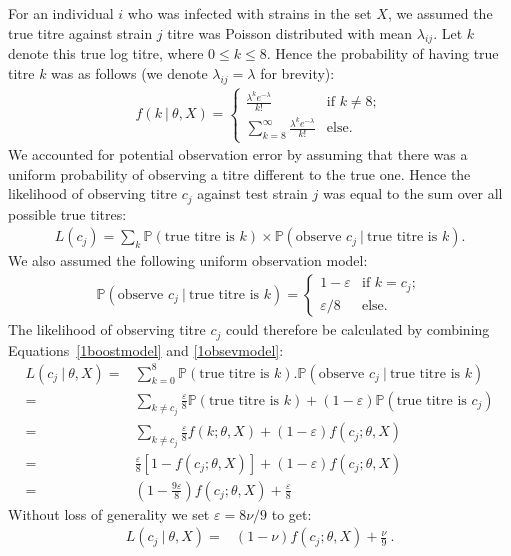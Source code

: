 \documentclass[12pt]{article}
\begin{document}
For an individual $i$ who was infected with strains in the set $X$, we assumed the true titre against strain $j$ titre was Poisson distributed with mean $\lambda_{ij}$. Let $k$ denote this true log titre, where $0 \leq k \leq 8$. Hence the probability of having true titre $k$ was as follows (we denote $\lambda_{ij}=\lambda$ for brevity):
\begin{align} 
f({k}~|~\theta,X)=  \left\{
\begin{array}{ll}
\frac{\lambda^{k} e^{-\lambda}}{{k}!} & \text{if } {k}\neq 8; \\
\sum_{k=8}^\infty  \frac{\lambda^{k} e^{-\lambda}}{{k}!} & \text{else}. \label{1boostmodel}
\end{array} \right.
\end{align}
We accounted for potential observation error by assuming that there was a uniform probability of observing a titre different to the true one. Hence the likelihood of observing titre $c_j$ against test strain $j$ was equal to the sum over all possible true titres: 
\begin{align}
L( {c_j} )= \sum_{k} \mathbb{P}( \text{true titre is } k)\times \mathbb{P}(\text{observe } c_j ~|~ \text{true titre is } k).
\end{align}
We also assumed the following uniform observation model:
\begin{align} 
\mathbb{P}(\text{observe } c_j ~|~ \text{true titre is } k)=  \left\{
\begin{array}{ll}
1-\varepsilon & \text{if } k=c_j; \\
\varepsilon/8 & \text{else} . \label{1obsevmodel}
\end{array} \right.
\end{align}
The likelihood of observing titre $c_j$ could therefore be calculated by combining Equations~\ref{1boostmodel} and \ref{1obsevmodel}:
\begin{align}
L( {c_j} ~|~  \theta,X)={}& \sum_{k=0}^8 \mathbb{P}( \text{true titre is } k) .  \mathbb{P}(\text{observe } c_j ~|~ \text{true titre is } k) \\
={}& \sum_{k \neq c_j} \frac{\varepsilon}{8} \mathbb{P}(\text{true titre is } k) +(1-\varepsilon) \mathbb{P}( \text{true titre is } c_j) \\
={}& \sum_{k \neq c_j} \frac{\varepsilon}{8} f({k};\theta,X) +(1-\varepsilon)f({c_j};\theta,X) \\
={}& \frac{\varepsilon}{8} [1-f({c_j};\theta,X)] +(1-\varepsilon)f({c_j};\theta,X) \\
={}& (1-\frac{9 \varepsilon}{8}) f({c_j};\theta,X)+\frac{\varepsilon}{8} 
\end{align}
Without loss of generality we set $\varepsilon=8\nu/9$ to get:
\begin{align}
L( {c_j} ~|~  \theta,X)={}& (1-\nu) f({c_j};\theta,X)+\frac{\nu}{9} \label{likefunc} ~.
\end{align}
\end{document}
